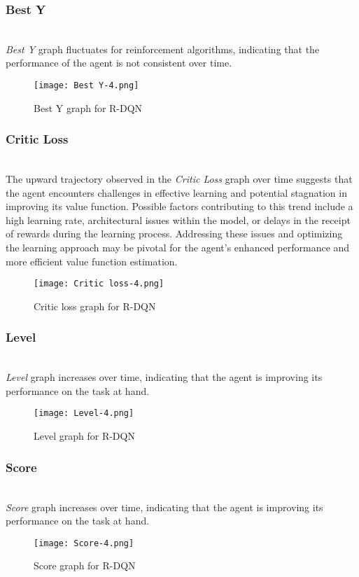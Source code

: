 \documentclass[preprint,12pt]{elsarticle}
\begin{document}
\subsubsection{Best Y}\\
\textit{Best Y} graph fluctuates for reinforcement algorithms, indicating that the performance of the agent is not consistent over time.
\graphicspath{ {./images/} }
\begin{figure}[!htbp]
  \centering
  \texttt{[image: Best Y-4.png]}
  \caption{Best Y graph for R-DQN}
  \label{fig:best-y-4}
\end{figure}


\subsubsection{Critic Loss}\\
The upward trajectory observed in the \textit{Critic Loss} graph over time suggests that the agent encounters challenges in effective learning and potential stagnation in improving its value function. Possible factors contributing to this trend include a high learning rate, architectural issues within the model, or delays in the receipt of rewards during the learning process. Addressing these issues and optimizing the learning approach may be pivotal for the agent's enhanced performance and more efficient value function estimation.

\graphicspath{ {./images/} }
\begin{figure}[!htbp]
  \centering
  \texttt{[image: Critic loss-4.png]}
  \caption{Critic loss graph for R-DQN}
  \label{fig:critic-loss-4}
\end{figure}


\subsubsection{Level}\\
\textit{Level} graph increases over time, indicating that the agent is improving its performance on the task at hand.
\graphicspath{ {./images/} }
\begin{figure}[!htbp]
  \centering
  \texttt{[image: Level-4.png]}
  \caption{Level graph for R-DQN}
  \label{fig:level-4}
\end{figure}


\subsubsection{Score}\\
\textit{Score} graph increases over time, indicating that the agent is improving its performance on the task at hand.
\graphicspath{ {./images/} }
\begin{figure}[!htbp]
  \centering
  \texttt{[image: Score-4.png]}
  \caption{Score graph for R-DQN}
  \label{fig:score-4}
\end{figure}
\end{document}
